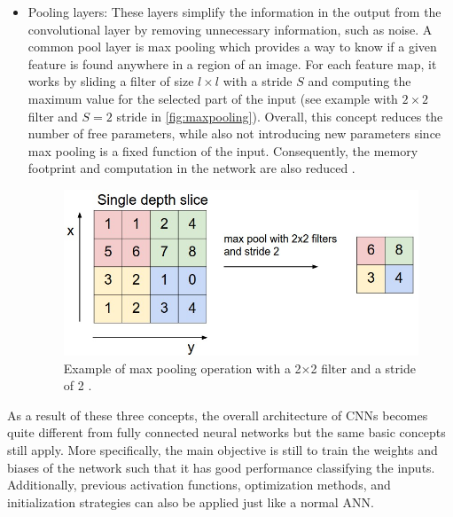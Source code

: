 \begin{itemize}
        \item Pooling layers: These layers simplify the information in the output from the convolutional layer by removing unnecessary information, such as noise. A common pool layer is max pooling which provides a way to know if a given feature is found anywhere in a region of an image. For each feature map, it works by sliding a filter of size $l \times l$ with a stride $S$ and computing the maximum value for the selected part of the input (see example with $2 \times 2$ filter and $S=2$ stride in \autoref{fig:maxpooling}). Overall, this concept reduces the number of free parameters, while also not introducing new parameters since max pooling is a fixed function of the input. Consequently, the memory footprint and computation in the network are also reduced \cite{Nielsen2017a}.
        \begin{figure}[ht]
          \centering
            \includegraphics[width=0.5\linewidth]{figs/maxpooling.png}
          \caption{Example of max pooling operation with a 2×2 filter and a stride of 2 \cite{standfordcnn}.}
          \label{fig:maxpooling}
        \end{figure}
    \end{itemize}
    As a result of these three concepts, the overall architecture of \ac{CNN}s becomes quite different from fully connected neural networks but the same basic concepts still apply. More specifically, the main objective is still to train the weights and biases of the network such that it has good performance classifying the inputs. Additionally, previous activation functions, optimization methods, and initialization strategies can also be applied just like a normal \ac{ANN}. \par 
    
